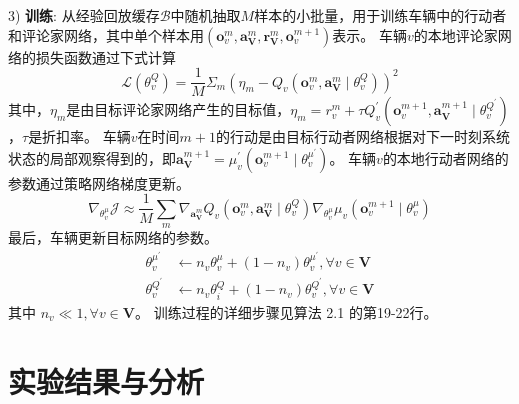 3) \textbf{训练}: 从经验回放缓存$\mathcal{B}$中随机抽取$M$样本的小批量，用于训练车辆中的行动者和评论家网络，其中单个样本用$(\boldsymbol{o}_{v}^{m}, \boldsymbol{a}_{\mathbf{V}}^{m}, \boldsymbol{r}_{\mathbf{V}}^{m}, \boldsymbol{o}_{v}^{m+1})$表示。
车辆$v$的本地评论家网络的损失函数通过下式计算
\begin{equation}
	\mathcal{L}\left(\theta_{v}^{Q}\right)=\frac{1}{M} \Sigma_{m}\left(\eta_{m}-Q_{v}\left(\boldsymbol{o}_{v}^{m}, \boldsymbol{a}_{\mathbf{V}}^{m} \mid \theta_{v}^{Q}\right)\right)^{2}
\end{equation}
\noindent 其中，$\eta_{m}$是由目标评论家网络产生的目标值，$\eta_{m}=r_{v}^{m}+\tau Q_{v}^{\prime}(\boldsymbol{o}_{v}^{m+1}, \boldsymbol{a}_{\mathbf{V}}^{m+1} \mid \theta_{v}^{Q^{\prime}})$，$\tau$是折扣率。
车辆$v$在时间$m+1$的行动是由目标行动者网络根据对下一时刻系统状态的局部观察得到的，即$\boldsymbol{a}_{\mathbf{V}}^{m+1}=\mu_{v}^{\prime}(\boldsymbol{o}_{v}^{m+1} \mid \theta_{v}^{\mu^{\prime}})$。
车辆$v$的本地行动者网络的参数通过策略网络梯度更新。
\begin{equation}
	\nabla_{\theta_{v}^{\mu}} \mathcal{J} \approx \frac{1}{M} \sum_{m} \nabla_{\boldsymbol{a}_{\mathbf{V}}^{m}} Q_{v}\left(\boldsymbol{o}_{v}^{m}, \boldsymbol{a}_{\mathbf{V}}^{m} \mid \theta_{v}^{Q}\right) \nabla_{\theta_{v}^{\mu}} \mu_{v}\left(\boldsymbol{o}_{v}^{m+1} \mid \theta_{v}^{\mu}\right)
\end{equation}
最后，车辆更新目标网络的参数。
\begin{align}
	\theta_{v}^{\mu^{\prime}} &\leftarrow n_{v} \theta_{v}^{\mu}+(1-n_{v})  \theta_{v}^{\mu^{\prime}}, \forall v \in \mathbf{V}\\
	\theta_{v}^{Q^{\prime}} &\leftarrow n_{v} \theta_{i}^{Q}+(1-n_{v})  \theta_{v}^{Q^{\prime}}, \forall v \in \mathbf{V}
\end{align}
\noindent 其中 $n_{v} \ll 1, \forall v \in \mathbf{V} $。
训练过程的详细步骤见算法 2.1 的第19-22行。

\section{实验结果与分析}\label{section 2-6}


